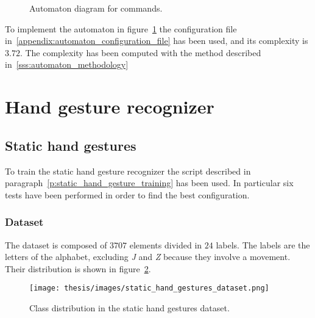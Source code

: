 \documentclass[../thesis.tex]{subfiles}
\begin{document}
\begin{figure}[ht]
    \centering
    \caption{Automaton diagram for commands.}\label{fig:automata_for_commands}
\end{figure}
To implement the automaton in figure~\ref{fig:automata_for_commands} the configuration file in~\ref{appendix:automaton_configuration_file} has been used, and its complexity is $3.72$. The complexity has been computed with the method described in~\ref{sss:automaton_methodology}

\section{Hand gesture recognizer}
\subsection{Static hand gestures}
To train the static hand gesture recognizer the script described in paragraph~\ref{p:static_hand_gesture_training} has been used. In particular six tests have been performed in order to find the best configuration.
\subsubsection{Dataset}\label{ss:dataset_static_gestures}
The dataset is composed of $3707$ elements divided in $24$ labels. The labels are the letters of the alphabet, excluding \textit{J} and \textit{Z} because they involve a movement. Their distribution is shown in figure~\ref{fig:class_distribution_static_hand_gestures}.
\begin{figure}[H]
    \centering
    \texttt{[image: thesis/images/static\_hand\_gestures\_dataset.png]}
    \caption{Class distribution in the static hand gestures dataset.}
    \label{fig:class_distribution_static_hand_gestures}
\end{figure}
\end{document}
